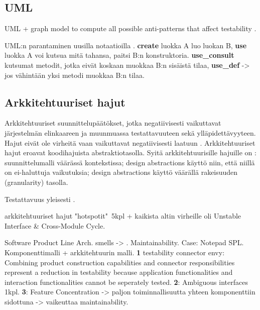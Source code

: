 \documentclass[finnish]{tktltiki2}
\theoremstyle{definition}
\theoremstyle{remark}
\begin{document}
\subsection{UML}

UML + graph model to compute all possible anti-patterns that affect testability \citep{baudry_testability_2002}.

UML:n parantaminen uusilla notaatioilla \citep[s. 4]{baudry_measuring_2003}. \textbf{create}  luokka A luo luokan B, \textbf{use}  luokka A voi kutsua mitä tahansa, paitsi B:n konstruktoria. \textbf{use\_consult}  kutsumat metodit, jotka eivät koskaan muokkaa B:n sisäistä tilaa, \textbf{use\_def} -> jos vähintään yksi metodi muokkaa B:n tilaa.




\subsection{Arkkitehtuuriset hajut}

Arkkitehtuuriset suunnittelupäätökset, jotka negatiivisesti vaikuttavat järjestelmän elinkaareen ja muunmuassa testattavuuteen sekä ylläpidettävyyteen. Hajut eivät ole virheitä vaan vaikuttavat negatiivisesti laatuun \citep[s. 1]{de_andrade_architectural_2014}. Arkkitehtuuriset hajut eroavat koodihajuista abstraktiotasolla. Syitä arkkitehtuurisille hajuille on \citep[s. 2]{de_andrade_architectural_2014}: suunnittelumalli väärässä kontekstissa; design abstractions käyttö niin, että niillä on ei-haluttuja vaikutuksia; design abstractions käyttö väärällä rakeisuuden (granularity) tasolla. 

Testattavuus \citep{garcia_identifying_2009} yleisesti \citep{bertran_detecting_2011}.

\citep{HotSpot} arkkitehtuuriset hajut "hotspotit"\ 5kpl + kaikista altin virheille oli \citep[s. 57]{HotSpot} Unstable Interface \& Cross-Module Cycle.

Software Product Line Arch. smells -> \citep{de_andrade_architectural_2014}. Maintainability. Case: Notepad SPL. Komponenttimalli + arkkitehtuurin malli. \textbf{1} testability connector envy: Combining product construction capabilities and connector responsibilities represent a reduction in testability because application functionalities and interaction functionalities cannot be seperately tested. \textbf{2}: Ambiguous interfaces 1kpl. \textbf{3}: Feature Concentration -> paljon toiminnallisuutta yhteen komponenttiin sidottuna -> vaikeuttaa maintainability.  
\end{document}
